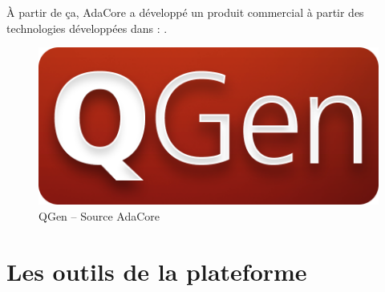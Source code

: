 À partir de ça, AdaCore a développé un produit commercial à partir des
technologies développées dans  : .

\begin{figure}[h]
  \centering
  \includegraphics[scale=0.2]{images/qgen}
  \caption{QGen -- Source AdaCore}
  \label{fig:qgen}
\end{figure}

\section{Les outils de la plateforme}
\lipsum
